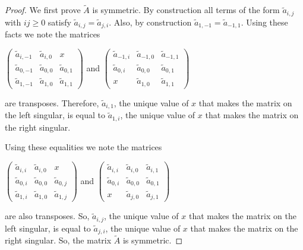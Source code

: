 \documentclass{article}
\begin{document}
\begin{proof}
  We first prove $\tilde{A}$ is symmetric. By construction all terms of the form $\tilde{a}_{i,j}$ with $ij \geq 0$ satisfy $\tilde{a}_{i,j} = \tilde{a}_{j,i}$. Also, by construction $\tilde{a}_{1,-1} = \tilde{a}_{-1,1}$. Using these facts we note the matrices   
  \begin{center}
    $\left(\begin{array}{ccc} \tilde{a}_{i,-1} & \tilde{a}_{i,0} & x \\ \tilde{a}_{0,-1} & \tilde{a}_{0,0} & \tilde{a}_{0,1} \\ \tilde{a}_{1,-1} & \tilde{a}_{1,0} & \tilde{a}_{1,1} \end{array}\right)$ \hspace{.1 in} and \hspace{.1 in} $\left(\begin{array}{ccc} \tilde{a}_{-1,i} & \tilde{a}_{-1,0} & \tilde{a}_{-1,1} \\ \tilde{a}_{0,i} & \tilde{a}_{0,0} & \tilde{a}_{0,1} \\ x & \tilde{a}_{1,0} & \tilde{a}_{1,1} \end{array}\right)$
  \end{center} 
  are transposes. Therefore, $\tilde{a}_{i,1}$, the unique value of $x$ that makes the matrix on the left singular, is equal to $\tilde{a}_{1,i}$, the unique value of $x$ that makes the matrix on the right singular.
  
  Using these equalities we note the matrices
  \begin{center}    
    $\left(\begin{array}{ccc} \tilde{a}_{i,i} & \tilde{a}_{i,0} & x \\ \tilde{a}_{0,i} & \tilde{a}_{0,0} & \tilde{a}_{0,j} \\ \tilde{a}_{1,i} & \tilde{a}_{1,0} & \tilde{a}_{1,j} \end{array}\right)$ \hspace{.1 in} and \hspace{.1 in} $\left(\begin{array}{ccc} \tilde{a}_{i,i} & \tilde{a}_{i,0} & \tilde{a}_{i,1} \\ \tilde{a}_{0,i} & \tilde{a}_{0,0} & \tilde{a}_{0,1} \\ x & \tilde{a}_{j,0} & \tilde{a}_{j,1} \end{array}\right)$
  \end{center}  
  are also transposes. So, $\tilde{a}_{i,j}$, the unique value of $x$ that makes the matrix on the left singular, is equal to $\tilde{a}_{j,i}$, the unique value of $x$ that makes the matrix on the right singular. So, the matrix $\tilde{A}$ is symmetric.
  

\end{proof}
\end{document}
